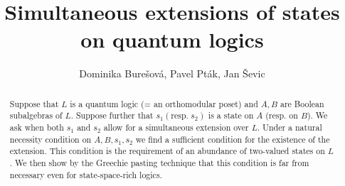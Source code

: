 \documentclass{article}
\begin{document}
\newtheorem{proposition}{Proposition}[section]
\newtheorem{question}[proposition]{Question}
\newtheorem{note}[proposition]{Note}
\newtheorem{theorem}[proposition]{Theorem}
\newtheorem{corollary}[proposition]{Corollary}
\newtheorem{lemma}[proposition]{Lemma}
\newtheorem{consequence}[proposition]{Consequence}
\theoremstyle{definition}
\newtheorem{definition}[proposition]{Definition}
\newtheorem{example}[proposition]{Example}
\newtheorem{remark}[proposition]{Remark}
\newtheorem{claim}[proposition]{Claim}
\newtheorem{construction}[proposition]{Construction}
\newtheorem{assumption}[proposition]{Assumption}


\author{Dominika Bure\v{s}ov\'{a}, Pavel Pt\'{a}k, Jan \v{S}evic}

\title{Simultaneous extensions of states on quantum logics}




\maketitle


\begin{abstract}
   Suppose that $L$ is a quantum logic (= an orthomodular poset) and
$A,B$ are Boolean subalgebras of $L$. Suppose further that
$s_1(\mathrm{resp.}\; s_2)$ is a state on $A$
(resp. on $B$). We ask when both $s_1$ and $s_2$
allow for a simultaneous extension over $L$.
Under a natural necessity condition on
$A,B,s_1,s_2$ we find a sufficient condition
for the existence of the extension.
This condition is the requirement of an abundance
of two-valued states on $L$. We then show
by the Greechie pasting technique that this condition is far from necessary even for state-space-rich logics.
\end{abstract}
\end{document}
